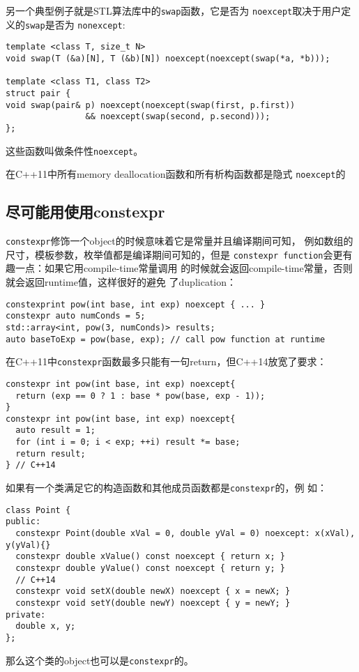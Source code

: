 另一个典型例子就是STL算法库中的\texttt{swap}函数，它是否为
\texttt{noexcept}取决于用户定义的\texttt{swap}是否为
\texttt{nonexcept}:
\begin{verbatim}
template <class T, size_t N>
void swap(T (&a)[N], T (&b)[N]) noexcept(noexcept(swap(*a, *b)));

template <class T1, class T2>
struct pair {
void swap(pair& p) noexcept(noexcept(swap(first, p.first))
                && noexcept(swap(second, p.second)));
};
\end{verbatim}
这些函数叫做条件性\texttt{noexcept}。

在C++11中所有memory deallocation函数和所有析构函数都是隐式
\texttt{noexcept}的

\subsection{尽可能用使用constexpr}
\label{sec:Item2-15}

\texttt{constexpr}修饰一个object的时候意味着它是常量并且编译期间可知，
例如数组的尺寸，模板参数，枚举值都是编译期间可知的，但是
\texttt{constexpr function}会更有趣一点：如果它用compile-time常量调用
的时候就会返回compile-time常量，否则就会返回runtime值，这样很好的避免
了duplication：
\begin{verbatim}
constexprint pow(int base, int exp) noexcept { ... }
constexpr auto numConds = 5; 
std::array<int, pow(3, numConds)> results;
auto baseToExp = pow(base, exp); // call pow function at runtime
\end{verbatim}

在C++11中\texttt{constexpr}函数最多只能有一句return，但C++14放宽了要求：
\begin{verbatim}
constexpr int pow(int base, int exp) noexcept{
  return (exp == 0 ? 1 : base * pow(base, exp - 1));
}
constexpr int pow(int base, int exp) noexcept{
  auto result = 1;
  for (int i = 0; i < exp; ++i) result *= base;
  return result;
} // C++14
\end{verbatim}

如果有一个类满足它的构造函数和其他成员函数都是\texttt{constexpr}的，例
如：
\begin{verbatim}
class Point {
public:
  constexpr Point(double xVal = 0, double yVal = 0) noexcept: x(xVal), y(yVal){}
  constexpr double xValue() const noexcept { return x; }
  constexpr double yValue() const noexcept { return y; }
  // C++14
  constexpr void setX(double newX) noexcept { x = newX; }
  constexpr void setY(double newY) noexcept { y = newY; }
private:
  double x, y;
};
\end{verbatim}
那么这个类的object也可以是\texttt{constexpr}的。

